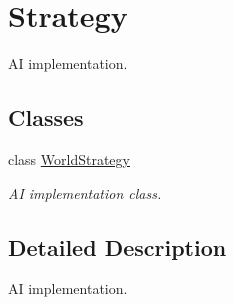 \hypertarget{group__strategy}{}\section{Strategy}
\label{group__strategy}


AI implementation.  


\subsection*{Classes}
\begin{DoxyCompactItemize}
\item 
class \hyperlink{classWorldStrategy}{World\+Strategy}
\begin{DoxyCompactList}\small\item\em AI implementation class. \end{DoxyCompactList}\end{DoxyCompactItemize}


\subsection{Detailed Description}
AI implementation. 

